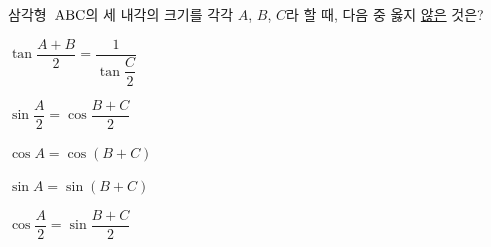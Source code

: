 삼각형~$\mathrm{ABC}$의 세 내각의 크기를 각각 $A$, $B$, $C$라 할 때, 다음 중 옳지 \underline{않은} 것은?
\begin{choicesii}{\rule[-3ex]{0pt}{8ex}$\tan\dfrac{A+B}{2}=\dfrac{1}{\tan\dfrac{C}{2}}$}{\rule[-3ex]{0pt}{8ex}$\sin\dfrac{A}{2}=\cos\dfrac{B+C}{2}$}{\rule[-3ex]{0pt}{8ex}$\cos A=\cos(B+C)$}{\rule[-3ex]{0pt}{8ex}$\sin A=\sin(B+C)$}{\rule[-3ex]{0pt}{8ex}$\cos\dfrac{A}{2}=\sin\dfrac{B+C}{2}$}\end{choicesii}

